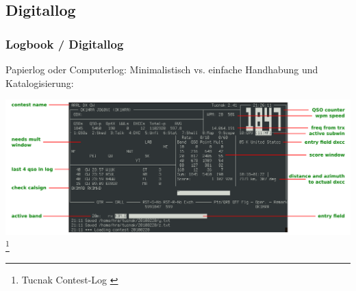 \subsection{Digitallog}

\begin{frame}
    \frametitle{Logbook / Digitallog}

    Papierlog oder Computerlog: Minimalistisch vs. einfache Handhabung und
    Katalogisierung:

    \begin{center}
        \includegraphics[width=1\textwidth]{bv13/tucnak_Hf-10.png}
        \tiny \footnote{Tucnak Contest-Log \hyperlink{refs}{\cite{tucn}}}
    \end{center}

\end{frame}


